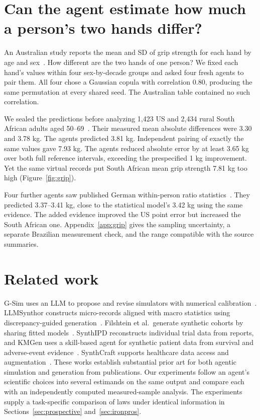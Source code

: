 \documentclass[sigconf,anonymous,review]{acmart}
\begin{document}
\section{Can the agent estimate how much a person's two hands differ?}
\label{sec:grip}
An Australian study reports the mean and SD of grip strength for each hand by age and sex~\cite{grip_adelaide}. How different are the two hands of one person? We fixed each hand's values within four sex-by-decade groups and asked four fresh agents to pair them. All four chose a Gaussian copula with correlation 0.80, producing the same permutation at every shared seed. The Australian table contained no such correlation.

We sealed the predictions before analyzing 1,423 US and 2,434 rural South African adults aged 50--69~\cite{grip_cdc,grip_haalsi}. Their measured mean absolute differences were 3.30 and 3.78 kg. The agents predicted 3.81 kg. Independent pairing of exactly the same values gave 7.93 kg. The agents reduced absolute error by at least 3.65 kg over both full reference intervals, exceeding the prespecified 1 kg improvement. Yet the same virtual records put South African mean grip strength 7.81 kg too high (Figure~\ref{fig:grip}).

Four further agents saw published German within-person ratio statistics~\cite{grip_ratio}. They predicted 3.37--3.41 kg, close to the statistical model's 3.42 kg using the same evidence. The added evidence improved the US point error but increased the South African one. Appendix~\ref{app:grip} gives the sampling uncertainty, a separate Brazilian measurement check, and the range compatible with the source summaries.



\section{Related work}
G-Sim uses an LLM to propose and revise simulators with numerical calibration~\cite{gsim}. LLMSynthor constructs micro-records aligned with macro statistics using discrepancy-guided generation~\cite{llmsynthor}. Filshtein et al.\ generate synthetic cohorts by sharing fitted models~\cite{filshtein}. SynthIPD reconstructs individual trial data from reports, and KMGen uses a skill-based agent for synthetic patient data from survival and adverse-event evidence~\cite{synthipd,kmgen}. SynthCraft supports healthcare data access and augmentation~\cite{synthcraft}. These works establish substantial prior art for both agentic simulation and generation from publications. Our experiments follow an agent's scientific choices into several estimands on the same output and compare each with an independently computed measured-sample analysis. The experiments supply a task-specific comparison of laws under identical information in Sections~\ref{sec:prospective} and~\ref{sec:ironpros}.
\end{document}
